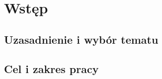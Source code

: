 \chapter[Wstęp]{Wstęp}
\label{chapter:introduction}

\section{Uzasadnienie i wybór tematu}
\section{Cel i zakres pracy}